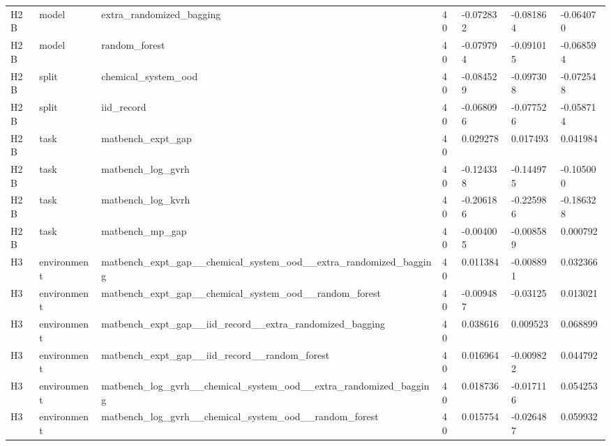 \documentclass[10pt]{article}
\begin{document}
\begin{landscape}
\begin{longtable}{L{.35in}L{.6in}L{3.55in}L{.4in}L{.88in}L{.88in}L{.88in}}
H2B & model & extra\_\allowbreak{}randomized\_\allowbreak{}bagging & 40 & -0.072832 & -0.081864 & -0.064070\\
H2B & model & random\_\allowbreak{}forest & 40 & -0.079794 & -0.091015 & -0.068594\\
H2B & split & chemical\_\allowbreak{}system\_\allowbreak{}ood & 40 & -0.084529 & -0.097308 & -0.072548\\
H2B & split & iid\_\allowbreak{}record & 40 & -0.068096 & -0.077526 & -0.058714\\
H2B & task & matbench\_\allowbreak{}expt\_\allowbreak{}gap & 40 & 0.029278 & 0.017493 & 0.041984\\
H2B & task & matbench\_\allowbreak{}log\_\allowbreak{}gvrh & 40 & -0.124338 & -0.144975 & -0.105000\\
H2B & task & matbench\_\allowbreak{}log\_\allowbreak{}kvrh & 40 & -0.206186 & -0.225986 & -0.186328\\
H2B & task & matbench\_\allowbreak{}mp\_\allowbreak{}gap & 40 & -0.004005 & -0.008589 & 0.000792\\
H3 & environment & matbench\_\allowbreak{}expt\_\allowbreak{}gap\_\allowbreak{}\_\allowbreak{}chemical\_\allowbreak{}system\_\allowbreak{}ood\_\allowbreak{}\_\allowbreak{}extra\_\allowbreak{}randomized\_\allowbreak{}bagging & 40 & 0.011384 & -0.008891 & 0.032366\\
H3 & environment & matbench\_\allowbreak{}expt\_\allowbreak{}gap\_\allowbreak{}\_\allowbreak{}chemical\_\allowbreak{}system\_\allowbreak{}ood\_\allowbreak{}\_\allowbreak{}random\_\allowbreak{}forest & 40 & -0.009487 & -0.03125 & 0.013021\\
H3 & environment & matbench\_\allowbreak{}expt\_\allowbreak{}gap\_\allowbreak{}\_\allowbreak{}iid\_\allowbreak{}record\_\allowbreak{}\_\allowbreak{}extra\_\allowbreak{}randomized\_\allowbreak{}bagging & 40 & 0.038616 & 0.009523 & 0.068899\\
H3 & environment & matbench\_\allowbreak{}expt\_\allowbreak{}gap\_\allowbreak{}\_\allowbreak{}iid\_\allowbreak{}record\_\allowbreak{}\_\allowbreak{}random\_\allowbreak{}forest & 40 & 0.016964 & -0.009822 & 0.044792\\
H3 & environment & matbench\_\allowbreak{}log\_\allowbreak{}gvrh\_\allowbreak{}\_\allowbreak{}chemical\_\allowbreak{}system\_\allowbreak{}ood\_\allowbreak{}\_\allowbreak{}extra\_\allowbreak{}randomized\_\allowbreak{}bagging & 40 & 0.018736 & -0.017116 & 0.054253\\
H3 & environment & matbench\_\allowbreak{}log\_\allowbreak{}gvrh\_\allowbreak{}\_\allowbreak{}chemical\_\allowbreak{}system\_\allowbreak{}ood\_\allowbreak{}\_\allowbreak{}random\_\allowbreak{}forest & 40 & 0.015754 & -0.026487 & 0.059932\\

\end{longtable}
\end{landscape}
\end{document}
